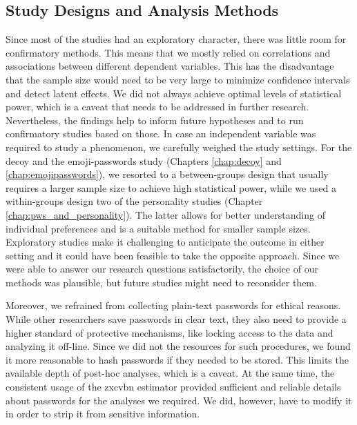 


\subsection{Study Designs and Analysis Methods}
Since most of the studies had an exploratory character, there was little room for confirmatory methods. This means that we mostly relied on correlations and associations between different dependent variables. This has the disadvantage that the sample size would need to be very large to minimize confidence intervals and detect latent effects. We did not always achieve optimal levels of statistical power, which is a caveat that needs to be addressed in further research. Nevertheless, the findings help to inform future hypotheses and to run confirmatory studies based on those. 
In case an independent variable was required to study a phenomenon, we carefully weighed the study settings. For the decoy and the emoji-passwords study (Chapters \ref{chap:decoy} and \ref{chap:emojipasswords}), we resorted to a between-groups design that usually requires a larger sample size to achieve high statistical power, while we used a within-groups design two of the personality studies (Chapter \ref{chap:pws_and_personality}). The latter allows for better understanding of individual preferences and is a suitable method for smaller sample sizes. Exploratory studies make it challenging to anticipate the outcome in either setting and it could have been feasible to take the opposite approach. Since we were able to answer our research questions satisfactorily, the choice of our methods was plausible, but future studies might need to reconsider them. 

Moreover, we refrained from collecting plain-text passwords for ethical reasons. While other researchers save passwords in clear text, they also need to provide a higher standard of protective mechanisms, like locking access to the data and analyzing it off-line. Since we did not the resources for such procedures, we found it more reasonable to hash passwords if they needed to be stored. This limits the available depth of post-hoc analyses, which is a caveat. At the same time, the consistent usage of the zxcvbn estimator provided sufficient and reliable details about passwords for the analyses we required. We did, however, have to modify it in order to strip it from sensitive information. 

